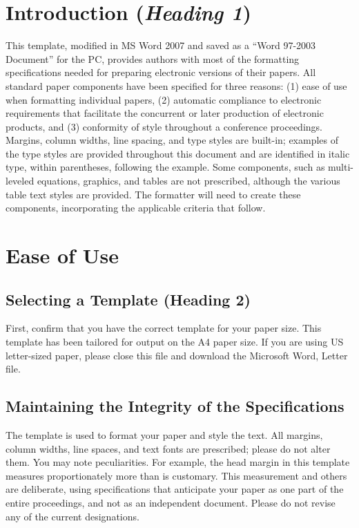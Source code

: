\documentclass[preprint,12pt,authoryear]{elsarticle}
\begin{document}
\section{Introduction (\textit{Heading 1})}

This template, modified in MS Word 2007 and saved as a “Word 97-2003 Document” for the PC, provides authors with most of the formatting specifications needed for preparing electronic versions of their papers. All standard paper components have been specified for three reasons: (1) ease of use when formatting individual papers, (2) automatic compliance to electronic requirements that facilitate the concurrent or later production of electronic products, and (3) conformity of style throughout a conference proceedings. Margins, column widths, line spacing, and type styles are built-in; examples of the type styles are provided throughout this document and are identified in italic type, within parentheses, following the example. Some components, such as multi-leveled equations, graphics, and tables are not prescribed, although the various table text styles are provided. The formatter will need to create these components, incorporating the applicable criteria that follow.

\section{Ease of Use}

\subsection{Selecting a Template (Heading 2)}

First, confirm that you have the correct template for your paper size. This template has been tailored for output on the A4 paper size. If you are using US letter-sized paper, please close this file and download the Microsoft Word, Letter file.

\subsection{Maintaining the Integrity of the Specifications}

The template is used to format your paper and style the text. All margins, column widths, line spaces, and text fonts are prescribed; please do not alter them. You may note peculiarities. For example, the head margin in this template measures proportionately more than is customary. This measurement and others are deliberate, using specifications that anticipate your paper as one part of the entire proceedings, and not as an independent document. Please do not revise any of the current designations.
\end{document}
